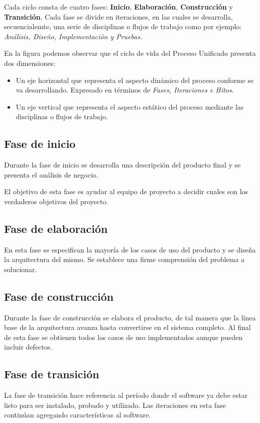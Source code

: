 Cada ciclo consta de cuatro fases: \textbf{Inicio}, \textbf{Elaboración}, \textbf{Construcción} y \textbf{Transición}. Cada fase se divide en iteraciones, en las cuales se desarrolla, secuencialemte, una serie de disciplinas o flujos de trabajo como por ejemplo: \textit{Análisis, Diseño, Implementación y Pruebas.}

En la figura podemos observar que el ciclo de vida del Proceso Unificado presenta dos dimensiones:
\begin{itemize}
	\item Un eje horizontal que representa el aspecto dinámico del proceso conforme se va desarrollando. Expresado en términos de \textit{Fases, Iteraciones e Hitos}.
	\item Un eje vertical que representa el aspecto estático del proceso mediante las disciplinas o flujos de trabajo.
\end{itemize}


\subsection{Fase de inicio}
Durante la fase de inicio se desarrolla una descripción del producto final y se presenta el análisis de negocio.

El objetivo de esta fase es ayudar al equipo de proyecto a decidir cuales son los verdaderos objetivos del proyecto.

\subsection{Fase de elaboración}
En esta fase se especifican la mayoría de los casos de uso del producto y se diseña la arquitectura del mismo. Se establece una firme comprensión del problema a solucionar.


\subsection{Fase de construcción}
Durante la fase de construcción se elabora el producto, de tal manera que la línea base de la arquitectura avanza hasta convertirse en el sistema completo. Al final de esta fase se obtienen todos los casos de uso implementados aunque pueden incluir defectos.


\subsection{Fase de transición}
La fase de transición hace referencia al período donde el software ya debe estar listo para ser instalado, probado y utilizado. Las iteraciones en esta fase continúan agregando características al software.


